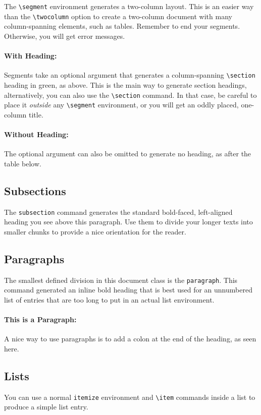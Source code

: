 \documentclass[
]{dragonbane-supplement}
\begin{document}
\begin{segment}[Segments]
The \texttt{\textbackslash segment} environment generates a two-column layout. This is an easier way than the \texttt{\textbackslash twocolumn} option to create a two-column document with many column-spanning elements, such as tables. Remember to end your segments. Otherwise, you will get error messages.

\paragraph{With Heading:}
Segments take an optional argument that generates a column-spanning \texttt{\textbackslash section} heading in green, as above. This is the main way to generate section headings, alternatively, you can also use the \texttt{\textbackslash section} command. In that case, be careful to place it \emph{outside} any \texttt{\textbackslash segment} environment, or you will get an oddly placed, one-column title.

\paragraph{Without Heading:}
The optional argument can also be omitted to generate no heading, as after the table below.

\subsection{Subsections}
The \texttt{subsection} command generates the standard bold-faced, left-aligned heading you see above this paragraph. Use them to divide your longer texts into smaller chunks to provide a nice orientation for the reader.

\subsection{Paragraphs}
The smallest defined division in this document class is the \texttt{paragraph}. This command generated an inline bold heading that is best used for an unnumbered list of entries that are too long to put in an actual list environment.

\paragraph{This is a Paragraph:}
A nice way to use paragraphs is to add a colon at the end of the heading, as seen here.


\subsection{Lists}
You can use a normal \texttt{itemize} environment and \texttt{\textbackslash item} commands inside a list to produce a simple list entry.


\end{segment}
\end{document}
